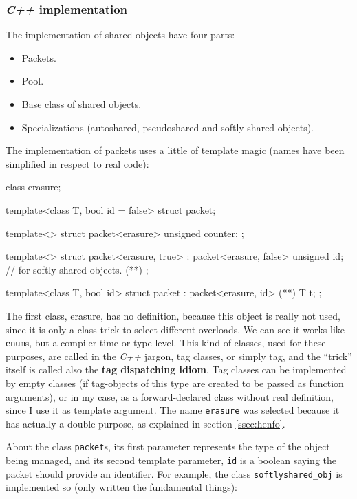 \documentclass{article}
\begin{document}
\subsubsection{\textit{C++} implementation}
The implementation of shared objects have four parts:

\begin{itemize}
\item Packets.
\item Pool.
\item Base class of shared objects.
\item Specializations (autoshared, pseudoshared and softly shared objects).
\end{itemize}

The implementation of packets uses a little of template magic (names have been
simplified in respect to real code):

\begin{Cpp}
   class erasure;

   template<class T, bool id = false>
   struct packet;

   template<>
   struct packet<erasure>
   {
       unsigned counter;
   };

   template<>
   struct packet<erasure, true> : packet<erasure, false>
   {
       unsigned id; // for softly shared objects. (*\label{uid}*)
   };

   template<class T, bool id>
   struct packet : packet<erasure, id> (*\label{bpack}*)
   {
        T t;
   };
\end{Cpp}

The first class, erasure, has no definition, because this object is really not
used, since it is only a class-trick to select different overloads. We can see
it works like \texttt{enum}s, but a compiler-time or type level. This kind of
classes, used for these purposes, are called in the \textit{C++} jargon, tag
classes, or simply tag, and the ``trick'' itself is called also the \textbf{tag
  dispatching idiom}. Tag classes can be implemented by empty classes (if
tag-objects of this type are created to be passed as function arguments), or in
my case, as a forward-declared class without real definition, since I use it as
template argument. The name \texttt{erasure} was selected because it has actually
a double purpose, as explained in section \ref{ssec:henfo}.

About the class \texttt{packet}s, its first parameter represents the type of the
object being managed, and its second template parameter, \texttt{id} is a
boolean saying the packet should provide an identifier. For example, the class
\texttt{softlyshared\_obj} is implemented so (only written the fundamental
things):
\end{document}

